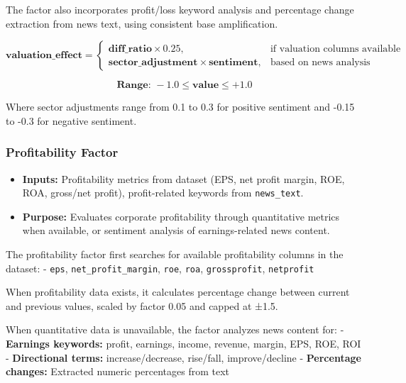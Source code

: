 \documentclass[3p,times,procedia]{elsarticle}
\begin{document}
The factor also incorporates profit/loss keyword analysis and percentage change extraction from news text, using consistent base amplification.

\begin{equation}
\textbf{valuation\_effect} = 
\begin{cases} 
\textbf{diff\_ratio} \times 0.25, & \text{if valuation columns available} \\
\textbf{sector\_adjustment} \times \textbf{sentiment}, & \text{based on news analysis}
\end{cases}
\end{equation}

\begin{equation}
\textbf{Range: } -1.0 \leq \textbf{value} \leq +1.0
\end{equation}

Where sector adjustments range from 0.1 to 0.3 for positive sentiment and -0.15 to -0.3 for negative sentiment.

\subsubsection{{Profitability Factor}}
\begin{itemize}
    \item \textbf{Inputs:} Profitability metrics from dataset \cite{FinReportDataset2025} (EPS, net profit margin, ROE, ROA, gross/net profit), profit-related keywords from \texttt{news\_text}.
    \item \textbf{Purpose:} Evaluates corporate profitability through quantitative metrics when available, or sentiment analysis of earnings-related news content.
\end{itemize}

The profitability factor first searches for available profitability columns in the dataset:
- \texttt{eps}, \texttt{net\_profit\_margin}, \texttt{roe}, \texttt{roa}, \texttt{grossprofit}, \texttt{netprofit}

When profitability data exists, it calculates percentage change between current and previous values, scaled by factor 0.05 and capped at ±1.5.

When quantitative data is unavailable, the factor analyzes news content for:
- \textbf{Earnings keywords:} profit, earnings, income, revenue, margin, EPS, ROE, ROI
- \textbf{Directional terms:} increase/decrease, rise/fall, improve/decline
- \textbf{Percentage changes:} Extracted numeric percentages from text
\end{document}
